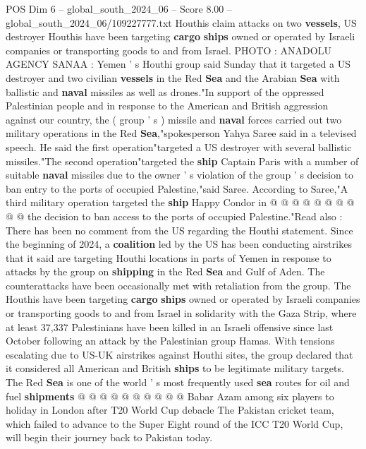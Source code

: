 \begin{textsample}{POS Dim 6 – global\_south\_2024\_06 – Score 8.00 – global\_south\_2024\_06/109227777.txt}  \label{ex:f6_pos_152}
Houthis claim attacks on two \textbf{vessels}, US destroyer Houthis have been targeting \textbf{cargo} \textbf{ships} owned or operated by Israeli companies or transporting goods to and from Israel.
PHOTO : ANADOLU AGENCY SANAA : Yemen ' s Houthi group said Sunday that it targeted a US destroyer and two civilian \textbf{vessels} in the Red \textbf{Sea} and the Arabian \textbf{Sea} with ballistic and \textbf{naval} missiles as well as drones."In support of the oppressed Palestinian people and in response to the American and British aggression against our country, the ( group ' s ) missile and \textbf{naval} forces carried out two military operations in the Red \textbf{Sea},"spokesperson Yahya Saree said in a televised speech.
He said the first operation"targeted a US destroyer with several ballistic missiles."The second operation"targeted the \textbf{ship} Captain Paris with a number of suitable \textbf{naval} missiles due to the owner ' s violation of the group ' s decision to ban entry to the ports of occupied Palestine,"said Saree.
According to Saree,"A third military operation targeted the \textbf{ship} Happy Condor in @ @ @ @ @ @ @ @ @ @ the decision to ban access to the ports of occupied Palestine."Read also : There has been no comment from the US regarding the Houthi statement.
Since the beginning of 2024, a \textbf{coalition} led by the US has been conducting airstrikes that it said are targeting Houthi locations in parts of Yemen in response to attacks by the group on \textbf{shipping} in the Red \textbf{Sea} and Gulf of Aden.
The counterattacks have been occasionally met with retaliation from the group.
The Houthis have been targeting \textbf{cargo} \textbf{ships} owned or operated by Israeli companies or transporting goods to and from Israel in solidarity with the Gaza Strip, where at least 37,337 Palestinians have been killed in an Israeli offensive since last October following an attack by the Palestinian group Hamas.
With tensions escalating due to US-UK airstrikes against Houthi sites, the group declared that it considered all American and British \textbf{ships} to be legitimate military targets.
The Red \textbf{Sea} is one of the world ' s most frequently used \textbf{sea} routes for oil and fuel \textbf{shipments} @ @ @ @ @ @ @ @ @ @ Babar Azam among six players to holiday in London after T20 World Cup debacle The Pakistan cricket team, which failed to advance to the Super Eight round of the ICC T20 World Cup, will begin their journey back to Pakistan today.

\end{textsample}
